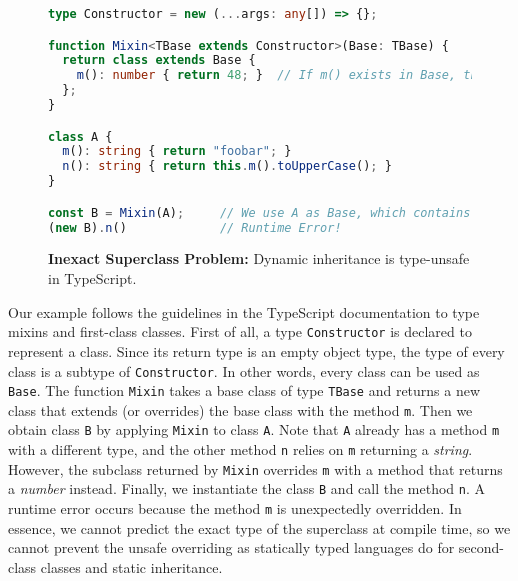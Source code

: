 \begin{figure}
\begin{lstlisting}[language=TypeScript]
type Constructor = new (...args: any[]) => {};

function Mixin<TBase extends Constructor>(Base: TBase) {
  return class extends Base {
    m(): number { return 48; }  // If m() exists in Base, that one will be overridden.
  };
}

class A {
  m(): string { return "foobar"; }
  n(): string { return this.m().toUpperCase(); }
}

const B = Mixin(A);     // We use A as Base, which contains m() with a different type.
(new B).n()             // Runtime Error!
\end{lstlisting}
\caption{\textbf{Inexact Superclass Problem:} Dynamic inheritance is type-unsafe in TypeScript.} \label{fig:dynamic}
\end{figure}

Our example follows the guidelines in the TypeScript documentation to type
mixins and first-class classes. First of all, a type \lstinline{Constructor} is
declared to represent a class. Since its return type is an empty object type,
the type of every class is a subtype of \lstinline{Constructor}. In other words,
every class can be used as \lstinline{Base}. The function \lstinline{Mixin}
takes a base class of type \lstinline{TBase} and returns a new class that
extends (or overrides) the base class with the method \lstinline{m}. Then we
obtain class \lstinline{B} by applying \lstinline{Mixin} to class \lstinline{A}.
Note that \lstinline{A} already has a method \lstinline{m} with a different
type, and the other method \lstinline{n} relies on \lstinline{m} returning a
\emph{string}. However, the subclass returned by \lstinline{Mixin} overrides
\lstinline{m} with a method that returns a \emph{number} instead. Finally, we
instantiate the class \lstinline{B} and call the method \lstinline{n}. A runtime
error occurs because the method \lstinline{m} is unexpectedly overridden. In
essence, we cannot predict the exact type of the superclass at compile time, so
we cannot prevent the unsafe overriding as statically typed languages do for
second-class classes and static inheritance.

